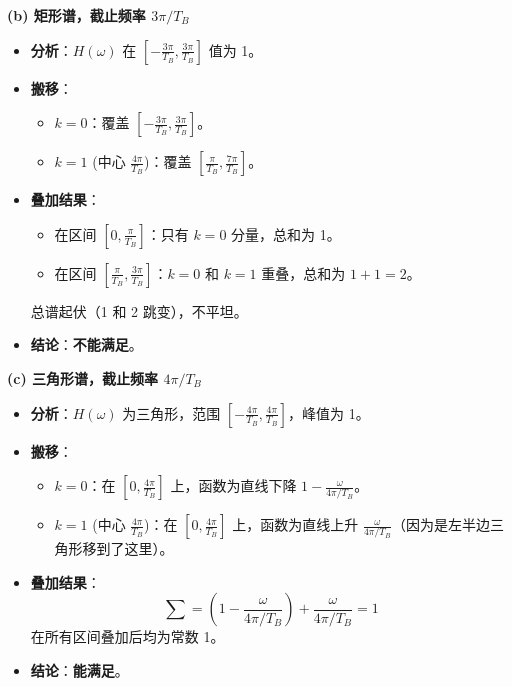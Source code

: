 \documentclass[a4paper,11pt]{ctexart}
\begin{document}
    \textbf{(b) 矩形谱，截止频率 $3\pi/T_B$}
    \begin{itemize}
        \item \textbf{分析}：$H(\omega)$ 在 $[-\frac{3\pi}{T_B}, \frac{3\pi}{T_B}]$ 值为 1。
        \item \textbf{搬移}：
            \begin{itemize}
                \item $k=0$：覆盖 $[-\frac{3\pi}{T_B}, \frac{3\pi}{T_B}]$。
                \item $k=1$ (中心 $\frac{4\pi}{T_B}$)：覆盖 $[\frac{\pi}{T_B}, \frac{7\pi}{T_B}]$。
            \end{itemize}
        \item \textbf{叠加结果}：
            \begin{itemize}
                \item 在区间 $[0, \frac{\pi}{T_B}]$：只有 $k=0$ 分量，总和为 1。
                \item 在区间 $[\frac{\pi}{T_B}, \frac{3\pi}{T_B}]$：$k=0$ 和 $k=1$ 重叠，总和为 $1+1=2$。
            \end{itemize}
            总谱起伏（1 和 2 跳变），不平坦。
        \item \textbf{结论}：\textbf{不能满足}。
    \end{itemize}

    \textbf{(c) 三角形谱，截止频率 $4\pi/T_B$}
    \begin{itemize}
        \item \textbf{分析}：$H(\omega)$ 为三角形，范围 $[-\frac{4\pi}{T_B}, \frac{4\pi}{T_B}]$，峰值为 1。
        \item \textbf{搬移}：
            \begin{itemize}
                \item $k=0$：在 $[0, \frac{4\pi}{T_B}]$ 上，函数为直线下降 $1 - \frac{\omega}{4\pi/T_B}$。
                \item $k=1$ (中心 $\frac{4\pi}{T_B}$)：在 $[0, \frac{4\pi}{T_B}]$ 上，函数为直线上升 $\frac{\omega}{4\pi/T_B}$（因为是左半边三角形移到了这里）。
            \end{itemize}
        \item \textbf{叠加结果}：
            $$ \sum = \left(1 - \frac{\omega}{4\pi/T_B}\right) + \frac{\omega}{4\pi/T_B} = 1 $$
            在所有区间叠加后均为常数 1。
        \item \textbf{结论}：\textbf{能满足}。
    \end{itemize}
\end{document}
